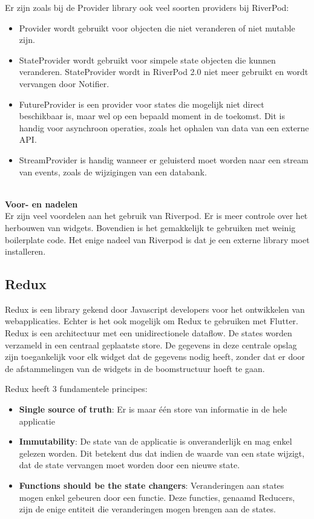 Er zijn zoals bij de Provider library ook veel soorten providers bij RiverPod: 
\begin{itemize}
    \item   Provider wordt gebruikt voor objecten die niet veranderen of niet mutable zijn. 
    \item   StateProvider wordt gebruikt voor simpele state objecten die kunnen veranderen. StateProvider wordt in RiverPod 2.0 niet meer gebruikt en wordt vervangen door Notifier.
    \item   FutureProvider is een provider voor states die mogelijk niet direct beschikbaar is, maar wel op een bepaald moment in de toekomst. Dit is handig voor asynchroon operaties, zoals het ophalen van data van een externe API.
    \item   StreamProvider is handig wanneer er geluisterd moet worden naar een stream van events, zoals de wijzigingen van een databank.
\end{itemize}
\hfill
\\ 
\textbf{Voor- en nadelen}\\
Er zijn veel voordelen aan het gebruik van Riverpod. Er is meer controle over het herbouwen van widgets. Bovendien is het gemakkelijk te gebruiken met weinig boilerplate code. 
Het enige nadeel van Riverpod is dat je een externe library moet installeren. 
 



\subsection{{Redux}}%
\label{sec:Redux}
Redux is een library gekend door Javascript developers voor het ontwikkelen van webapplicaties. Echter is het ook mogelijk om Redux te gebruiken met Flutter.
Redux is een architectuur met een unidirectionele dataflow. De states worden verzameld in een centraal geplaatste store. De gegevens in deze centrale 
opslag zijn toegankelijk voor elk widget dat de gegevens nodig heeft, zonder dat er door de afstammelingen van de widgets in de boomstructuur hoeft te gaan. \autocite{Jolayemi2021}

Redux heeft 3 fundamentele principes:
\begin{itemize}
    \item \textbf{Single source of truth}: Er is maar één store van informatie in de hele applicatie
    \item \textbf{Immutability}: De state van de applicatie is onveranderlijk en mag enkel gelezen worden. Dit betekent dus dat indien de waarde van een state wijzigt, dat de state 
         vervangen moet worden door een nieuwe state. 
    \item \textbf{Functions should be the state changers}: Veranderingen aan states mogen enkel gebeuren door een functie. Deze functies, genaamd Reducers, zijn de enige entiteit die veranderingen mogen brengen aan de states. 
\end{itemize}

